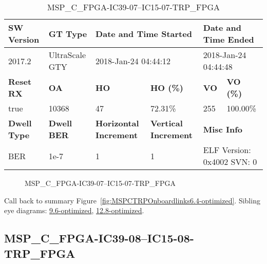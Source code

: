 \begin{table}[h]
\centering
\caption{MSP\_C\_FPGA-IC39-07--IC15-07-TRP\_FPGA}
\label{tab:MSPCFPGAIC3907IC1507TRPFPGA6.4-optimized}
\begin{tabular}{@{}|l|l|l|l|l|l|@{}}
\toprule
\textbf{SW Version}                & \textbf{GT Type}   & \multicolumn{2}{l|}{\textbf{Date and Time Started}}            & \multicolumn{2}{l|}{\textbf{Date and Time Ended}}        \\ \midrule
2017.2                       & UltraScale GTY          & \multicolumn{2}{l|}{2018-Jan-24 04:44:12}                   & \multicolumn{2}{l|}{2018-Jan-24 04:44:48}               \\ \midrule
\textbf{Reset RX}                  & \textbf{OA} & \textbf{HO}   & \textbf{HO (\%)} & \textbf{VO} & \textbf{VO (\%)} \\ \midrule
true & 10368        & 47          & 72.31\%        & 255        & 100.00\%       \\ \midrule
\textbf{Dwell Type}                & \textbf{Dwell BER} & \textbf{Horizontal Increment} & \textbf{Vertical Increment}    & \multicolumn{2}{l|}{\textbf{Misc Info}}                  \\ \midrule
BER                            & 1e-7        & 1        & 1           & \multicolumn{2}{l|}{ELF Version: 0x4002 SVN: 0}                         \\ \bottomrule
\end{tabular}
\end{table}

\begin{figure}[h]
\caption{MSP\_C\_FPGA-IC39-07--IC15-07-TRP\_FPGA} \label{fig:MSPCFPGAIC3907IC1507TRPFPGA6.4-optimized}
\end{figure}

Call back to summary Figure~\ref{fig:MSPCTRPOnboardlinks6.4-optimized}.
Sibling eye diagrams: \hyperref[sec:MSPCFPGAIC3907IC1507TRPFPGA9.6-optimized]{9.6-optimized}, \hyperref[sec:MSPCFPGAIC3907IC1507TRPFPGA12.8-optimized]{12.8-optimized}.

\clearpage
\newpage


\subsection{MSP\_C\_FPGA-IC39-08--IC15-08-TRP\_FPGA}\label{sec:MSPCFPGAIC3908IC1508TRPFPGA6.4-optimized}


